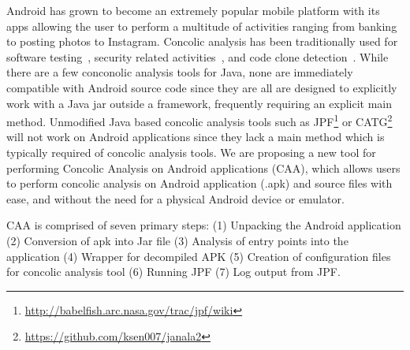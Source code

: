 \documentclass[conference]{IEEEtran}
\begin{document}
Android has grown to become an extremely popular mobile platform with its apps allowing the user to perform a multitude of activities ranging from banking to posting photos to Instagram. Concolic analysis has been traditionally used for software testing~\cite{Sen:2005:CCU:1081706.1081750}, security related activities~\cite{Chen:2014:CIB:2554850.2554875}, and code clone detection~\cite{Krutz_Sac15}. While there are a few conconolic analysis tools for Java, none are immediately compatible with Android source code since they are all are designed to explicitly work with a Java jar outside a framework, frequently requiring an explicit main method. Unmodified Java based concolic analysis tools such as JPF\footnote{\url{http://babelfish.arc.nasa.gov/trac/jpf/wiki}} or CATG\footnote{\url{https://github.com/ksen007/janala2}} will not work on Android applications since they lack a main method which is typically required of concolic analysis tools. We are proposing a new tool for performing Concolic Analysis on Android applications (CAA), which allows users to perform concolic analysis on Android application (.apk) and source files with ease, and without the need for a physical Android device or emulator. 


CAA is comprised of seven primary steps: (1) Unpacking the Android application (2) Conversion of apk into Jar file (3) Analysis of entry points into the application (4) Wrapper for decompiled APK (5) Creation of configuration files for concolic analysis tool (6) Running JPF (7) Log output from JPF.

\end{document}
